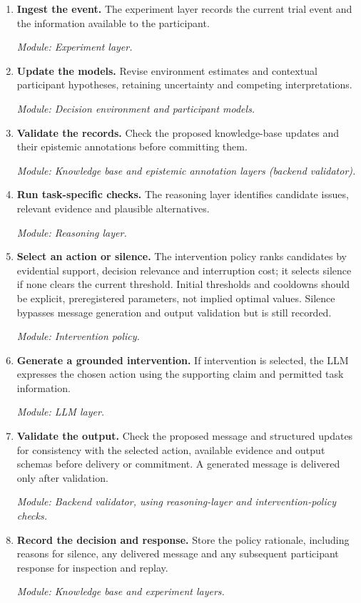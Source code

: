 \documentclass[11pt,a4paper]{article}
\begin{document}
\begin{minipage}{\linewidth}
\begin{minipage}[t]{0.61\linewidth}
\small\raggedright
\setlength{\parskip}{1pt}
\begin{enumerate}[leftmargin=1.4em,itemsep=3pt,topsep=0pt]
\item \textbf{Ingest the event.} The experiment layer records the current trial event and the information available to the participant.\par\emph{Module: Experiment layer.}
\item \textbf{Update the models.} Revise environment estimates and contextual participant hypotheses, retaining uncertainty and competing interpretations.\par\emph{Module: Decision environment and participant models.}
\item \textbf{Validate the records.} Check the proposed knowledge-base updates and their epistemic annotations before committing them.\par\emph{Module: Knowledge base and epistemic annotation layers (backend validator).}
\item \textbf{Run task-specific checks.} The reasoning layer identifies candidate issues, relevant evidence and plausible alternatives.\par\emph{Module: Reasoning layer.}
\item \textbf{Select an action or silence.} The intervention policy ranks candidates by evidential support, decision relevance and interruption cost; it selects silence if none clears the current threshold. Initial thresholds and cooldowns should be explicit, preregistered parameters, not implied optimal values. Silence bypasses message generation and output validation but is still recorded.\par\emph{Module: Intervention policy.}
\item \textbf{Generate a grounded intervention.} If intervention is selected, the LLM expresses the chosen action using the supporting claim and permitted task information.\par\emph{Module: LLM layer.}
\item \textbf{Validate the output.} Check the proposed message and structured updates for consistency with the selected action, available evidence and output schemas before delivery or commitment. A generated message is delivered only after validation.\par\emph{Module: Backend validator, using reasoning-layer and intervention-policy checks.}
\item \textbf{Record the decision and response.} Store the policy rationale, including reasons for silence, any delivered message and any subsequent participant response for inspection and replay.\par\emph{Module: Knowledge base and experiment layers.}
\end{enumerate}
\end{minipage}
\end{minipage}
\end{document}
